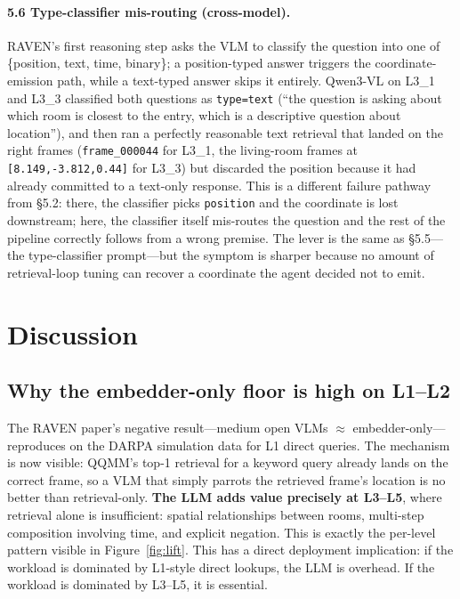 \documentclass[12pt,letterpaper,oneside]{article}
\begin{document}
\paragraph{5.6 Type-classifier mis-routing (cross-model).}
RAVEN's first reasoning step asks the VLM to classify the question
into one of \{position, text, time, binary\}; a position-typed
answer triggers the coordinate-emission path, while a text-typed
answer skips it entirely. Qwen3-VL on L3\_1 and L3\_3 classified
both questions as \texttt{type=text} (``the question is asking about
which room is closest to the entry, which is a descriptive question
about location''), and then ran a perfectly reasonable text
retrieval that landed on the right frames (\texttt{frame\_000044}
for L3\_1, the living-room frames at \texttt{[8.149,-3.812,0.44]}
for L3\_3) but discarded the position because it had already
committed to a text-only response. This is a different failure
pathway from \S5.2: there, the classifier picks \texttt{position}
and the coordinate is lost downstream; here, the classifier itself
mis-routes the question and the rest of the pipeline correctly
follows from a wrong premise. The lever is the same as \S5.5---the
type-classifier prompt---but the symptom is sharper because no
amount of retrieval-loop tuning can recover a coordinate the agent
decided not to emit.

\section{Discussion}\label{sec:discussion}

\subsection{Why the embedder-only floor is high on L1--L2}

The RAVEN paper's negative result---medium open VLMs $\approx$
embedder-only---reproduces on the DARPA simulation data for L1 direct
queries.  The mechanism is now visible: QQMM's top-1 retrieval for a
keyword query already lands on the correct frame, so a VLM that simply
parrots the retrieved frame's location is no better than
retrieval-only.  \textbf{The LLM adds value precisely at L3--L5},
where retrieval alone is insufficient: spatial relationships between
rooms, multi-step composition involving time, and explicit negation.
This is exactly the per-level pattern visible in
Figure~\ref{fig:lift}.  This has a direct deployment implication: if
the workload is dominated by L1-style direct lookups, the LLM is
overhead.  If the workload is dominated by L3--L5, it is essential.
\end{document}
